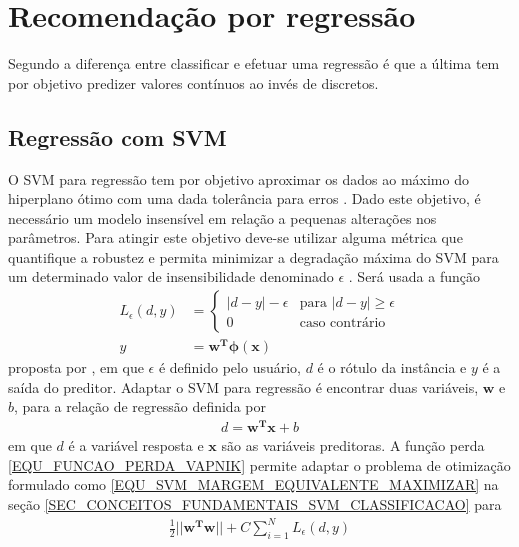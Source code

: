 \section{Recomendação por regressão}\label{SEC_RECOMENDACAO_REGRESSAO}
Segundo  a diferença entre classificar e efetuar uma regressão é que a última tem por objetivo predizer valores contínuos ao invés de discretos.

\subsection{Regressão com SVM}
O SVM para regressão tem por objetivo aproximar os dados ao máximo do hiperplano ótimo com uma dada tolerância para erros \cite{LIMA2004}. Dado este objetivo, é necessário um modelo insensível em relação a pequenas alterações nos parâmetros. Para atingir este objetivo deve-se utilizar alguma métrica que quantifique a robustez e permita minimizar a degradação máxima do SVM para um determinado valor de insensibilidade denominado \(\epsilon\) \cite{Haykin2007}. Será usada a função
\begin{align}
L_{\epsilon}(d, y) &= 	\begin{cases}\label{EQU_FUNCAO_PERDA_VAPNIK}
							|d - y| - \epsilon  &\textrm{para } |d - y| \geq \epsilon \\
							0					&\textrm{caso contrário}
						\end{cases} \\
y &= \mathbf{w^{T}}\bm{\phi(x)}
\end{align} %
proposta por , em que \(\epsilon\) é definido pelo usuário, \(d\) é o rótulo da instância e \(y\) é a saída do preditor. Adaptar o SVM para regressão é encontrar duas variáveis, \(\mathbf{w}\) e \(b\), para a relação de regressão definida por
\begin{align}
d = \mathbf{w^{T}x} + b
\end{align}
em que \(d\) é a variável resposta e \(\mathbf{x}\) são as variáveis preditoras. A função perda \eqref{EQU_FUNCAO_PERDA_VAPNIK} permite adaptar o problema de otimização formulado como \eqref{EQU_SVM_MARGEM_EQUIVALENTE_MAXIMIZAR} na seção \ref{SEC_CONCEITOS_FUNDAMENTAIS_SVM_CLASSIFICACAO} para
\begin{align}
\frac{1}{2}||\mathbf{w^{T}}\mathbf{w}|| + C \sum\limits_{i=1}^{N} L_{\epsilon}(d, y) \label{EQU_SVM_REGRESSAO_MINIMIZAR}
\end{align}
